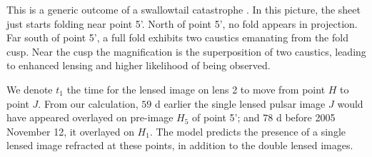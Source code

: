 \documentclass[useAMS,usenatbib]{mn2e}
\begin{document}
This is a generic outcome of a swallowtail
catastrophe \citep{Arnold1990}. In this picture, the sheet just
starts folding near point 5'.  North of point 5', no fold appears in
projection.  Far south of point 5', a full fold exhibits two caustics
emanating from the fold cusp.  Near the cusp the magnification is the
superposition of two caustics, leading to enhanced lensing and higher
likelihood of being observed.  

We denote $t_1$ the time for the lensed image on lens 2 to move from point
$H$ to point $J$. From our calculation, $59$ d earlier the
single lensed pulsar image  $J$ would have appeared overlayed on
pre-image $H_5$ of point
5'; and $78$ d 
before 2005 November 12, it overlayed on $H_1$. The
model predicts the presence of a single lensed image refracted at
these points, in addition to the double lensed images.

\end{document}
